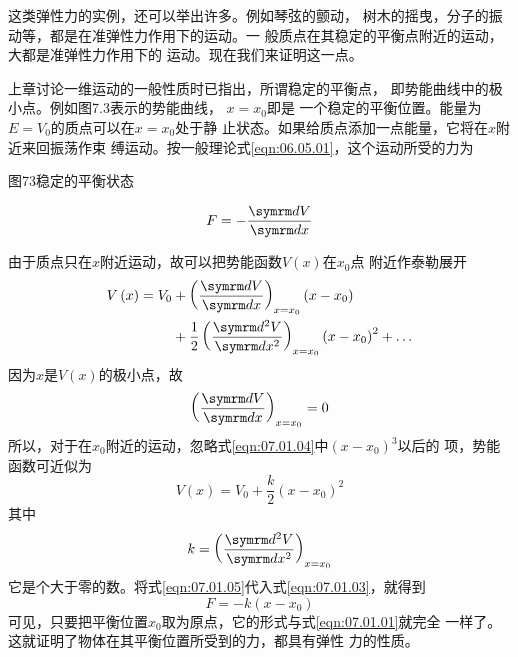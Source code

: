 这类弹性力的实例，还可以举出许多。例如琴弦的颤动，
树木的摇曳，分子的振动等，都是在准弹性力作用下的运动。一
般质点在其稳定的平衡点附近的运动，大都是准弹性力作用下的
运动。现在我们来证明这一点。

上章讨论一维运动的一般性质时已指出，所谓稳定的平衡点，
即势能曲线中的极小点。例如图7.3表示的势能曲线， $ x = x _ { 0 }   $即是
一个稳定的平衡位置。能量为$ E = V _ 0 $的质点可以在$  x = x _ { 0 }   $处于静
止状态。如果给质点添加一点能量，它将在$ x $附近来回振荡作束
缚运动。按一般理论式\eqref{eqn:06.05.01}，这个运动所受的力为

图73稳定的平衡状态

\begin{equation}\label{eqn:07.01.03}
	F = - \frac { \dif V } { \dif x }
\end{equation}

由于质点只在$ x $附近运动，故可以把势能函数$ V\left(x\right) $在$  x _ { 0 }   $点
附近作泰勒展开
\begin{equation}\label{eqn:07.01.04}
	\begin{aligned}
	V \left( x \right) = V _ { 0 } &+ \left ( \frac { \dif V } { \dif x } \right ) _ { x = x _ { 0 } } \left( x - x _ { 0 } \right)  \\
&+ \frac { 1 } { 2 } \left( \frac { \dif ^ { 2 } V } { \dif x ^ { 2 } } \right) _ { x = x _ { 0 } } \left( x - x _ { 0 } \right) ^ { 2 } + \dots
	\end{aligned}
\end{equation}
因为$ x $是$ V\left(x\right) $的极小点，故
\begin{equation*}
	\left( \frac { \dif V } { \dif x } \right) _ { x = x _ { 0 } }  = 0
\end{equation*}
所以，对于在$ x _ { 0 } $附近的运动，忽略式\eqref{eqn:07.01.04}中$ \left( x - x _ { 0 } \right) ^ { 3 }  $以后的
项，势能函数可近似为
\begin{equation}\label{eqn:07.01.05}
	V \left( x \right) = V _ { 0 } + \frac { k } { 2 } \left( x - x _ { 0 } \right) ^ { 2 }
\end{equation}
其中
\begin{equation}\label{eqn:07.01.06}
	k = \left( \frac { \dif ^ { 2 } V } { \dif x ^ { 2 } } \right) _ { x = x _ { 0 } }
\end{equation}
它是个大于零的数。将式\eqref{eqn:07.01.05}代入式\eqref{eqn:07.01.03}，就得到
\begin{equation}\label{eqn:07.01.07}
	F = - k \left( x - x _ { 0 } \right)
\end{equation}
可见，只要把平衡位置$ x _ 0 $取为原点，它的形式与式\eqref{eqn:07.01.01}就完全
一样了。这就证明了物体在其平衡位置所受到的力，都具有弹性
力的性质。

